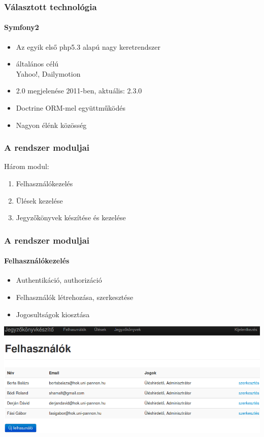\documentclass[12pt]{beamer}
\begin{document}
\begin{frame}
    \frametitle{Választott technológia}
    \framesubtitle{Symfony2}
    
    \large
    \begin{itemize}
        \item Az egyik első php5.3 alapú nagy keretrendszer
        \item általános célú\\
            \small{Yahoo!, Dailymotion}
        \large            
        \item 2.0 megjelenése 2011-ben, aktuális: 2.3.0
        \item Doctrine ORM-mel együttműködés
        \item Nagyon élénk közösség
    \end{itemize}
\end{frame}

\begin{frame}
    \frametitle{A rendszer moduljai}
    \Large
    
    Három modul:
    
    \begin{enumerate}
        \item Felhasználókezelés
        \item Ülések kezelése
        \item Jegyzőkönyvek készítése és kezelése
    \end{enumerate}
\end{frame}

\begin{frame}
    \frametitle{A rendszer moduljai}
    \framesubtitle{Felhasználókezelés}
    
    \begin{itemize}
        \item Authentikáció, authorizáció
        \item Felhasználók létrehozása, szerkesztése
        \item Jogosultságok kiosztása
    \end{itemize}
    
    \includegraphics[width=\textwidth,center]{felhasznalolista.png}   
\end{frame}
\end{document}
